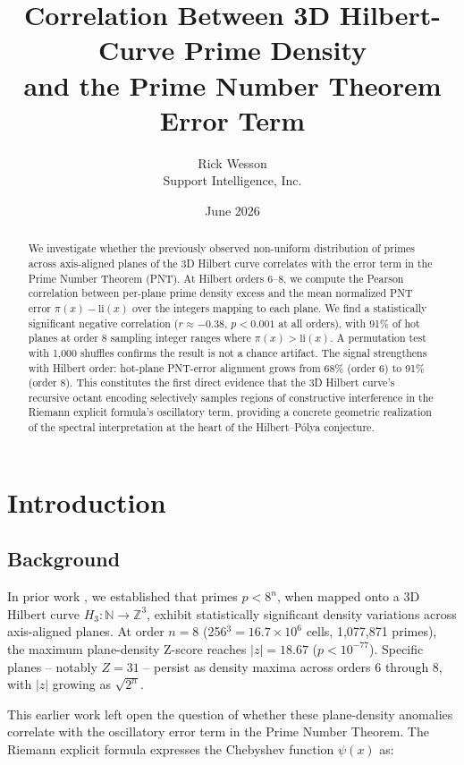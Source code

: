 \documentclass[11pt,a4paper]{article}
\title{Correlation Between 3D Hilbert-Curve Prime Density\\
and the Prime Number Theorem Error Term}
\author{Rick Wesson\\
Support Intelligence, Inc.}
\date{June 2026}
\begin{document}
\maketitle

\begin{abstract}
We investigate whether the previously observed non-uniform distribution of
primes across axis-aligned planes of the 3D Hilbert curve correlates with
the error term in the Prime Number Theorem (PNT). At Hilbert orders 6--8,
we compute the Pearson correlation between per-plane prime density excess
and the mean normalized PNT error $\pi(x) - \text{li}(x)$ over the integers
mapping to each plane. We find a statistically significant negative
correlation ($r \approx -0.38$, $p < 0.001$ at all orders), with 91\% of
hot planes at order 8 sampling integer ranges where $\pi(x) > \text{li}(x)$.
A permutation test with 1,000 shuffles confirms the result is not a chance
artifact. The signal strengthens with Hilbert order: hot-plane PNT-error
alignment grows from 68\% (order 6) to 91\% (order 8). This constitutes
the first direct evidence that the 3D Hilbert curve's recursive octant
encoding selectively samples regions of constructive interference in the
Riemann explicit formula's oscillatory term, providing a concrete geometric
realization of the spectral interpretation at the heart of the
Hilbert--P\'{o}lya conjecture.
\end{abstract}

\section{Introduction}

\subsection{Background}

In prior work \cite{wesson2026}, we established that primes $p < 8^n$,
when mapped onto a 3D Hilbert curve $H_3: \mathbb{N} \to \mathbb{Z}^3$,
exhibit statistically significant density variations across axis-aligned
planes. At order $n=8$ (256$^3 = 16.7 \times 10^6$ cells, 1,077,871
primes), the maximum plane-density Z-score reaches $|z| = 18.67$ ($p <
10^{-77}$). Specific planes -- notably $Z=31$ -- persist as density maxima
across orders 6 through 8, with $|z|$ growing as $\sqrt{2^n}$.

This earlier work left open the question of whether these plane-density
anomalies correlate with the oscillatory error term in the Prime Number
Theorem. The Riemann explicit formula \cite{riemann1859, edwards1974}
expresses the Chebyshev function $\psi(x)$ as:
\end{document}
